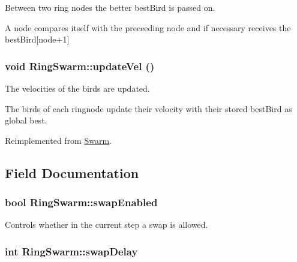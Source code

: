 Between two ring nodes the better bestBird is passed on. 

A node compares itself with the preceeding node and if necessary receives the bestBird\mbox{[}node+1\mbox{]} \hypertarget{classRingSwarm_6af7a38a18e36ee6dfb3b6e4524f9da9}{
\subsubsection{\setlength{\rightskip}{0pt plus 5cm}void RingSwarm::updateVel ()}}
\label{classRingSwarm_6af7a38a18e36ee6dfb3b6e4524f9da9}


The velocities of the birds are updated. 

The birds of each ringnode update their velocity with their stored bestBird as global best. 

Reimplemented from \hyperlink{classSwarm_be668c680f5bdd27bd2c4244a8a431bf}{Swarm}.

\subsection{Field Documentation}
\hypertarget{classRingSwarm_55b18dac3985e7cca8de7697b32d707a}{
\subsubsection{\setlength{\rightskip}{0pt plus 5cm}bool {\bf RingSwarm::swapEnabled}}}
\label{classRingSwarm_55b18dac3985e7cca8de7697b32d707a}


Controls whether in the current step a swap is allowed. 

\hypertarget{classRingSwarm_bc6194060dcd54ddfa56ec3b56b15515}{
\subsubsection{\setlength{\rightskip}{0pt plus 5cm}int {\bf RingSwarm::swapDelay}}}
\label{classRingSwarm_bc6194060dcd54ddfa56ec3b56b15515}


